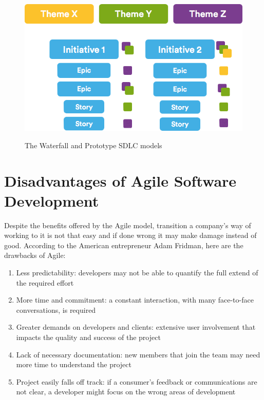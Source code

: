 	\begin{figure}[H]
		\centering
		\includegraphics[width=\textwidth]{resources/Themes}\\
		\caption{The Waterfall and Prototype SDLC models}
	\end{figure}
	
\section{Disadvantages of Agile Software Development}
	Despite the benefits offered by the Agile model, transition a company's way of working to it is not that easy and if done wrong it may make damage instead of good.
	According to the American entrepreneur Adam Fridman, here are the drawbacks\cite{massive-downside-of-agile} of Agile:
	\begin{enumerate}
		\item Less predictability: developers may not be able to quantify the full extend of the required effort
		\item More time and commitment: a constant interaction, with many face-to-face conversations, is required
		\item Greater demands on developers and clients: extensive user involvement that impacts the quality and success of the project
		\item Lack of necessary documentation: new members that join the team may need more time to understand the project
		\item Project easily falls off track: if a consumer's feedback or communications are not clear, a developer might focus on the wrong areas of development
	\end{enumerate}
	
